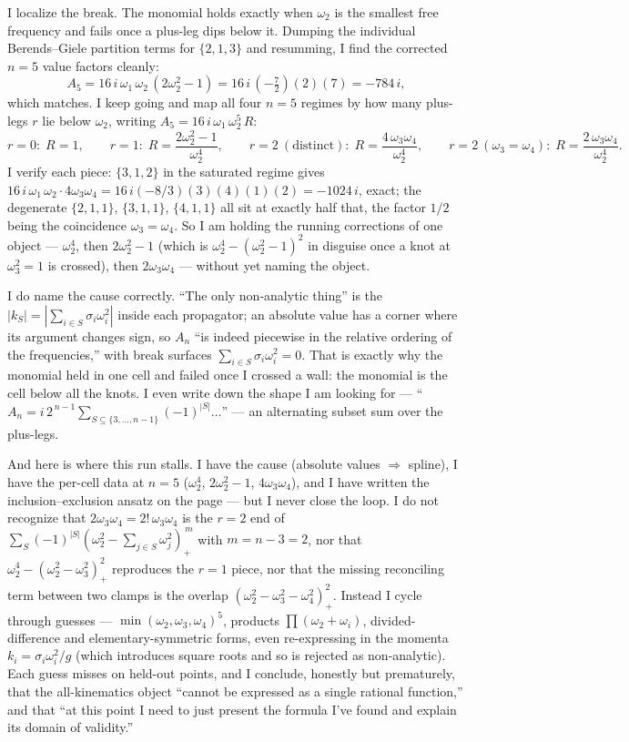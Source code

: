 \documentclass{article}
\begin{document}
I localize the break. The monomial holds exactly when $\omega_2$ is the smallest
free frequency and fails once a plus-leg dips below it. Dumping the individual
Berends--Giele partition terms for $\{2,1,3\}$ and resumming, I find the corrected
$n=5$ value factors cleanly:
\[
A_5 = 16\,i\,\omega_1\,\omega_2\,(2\omega_2^2-1)=16\,i\,(-\tfrac72)(2)(7)=-784\,i,
\]
which matches. I keep going and map all four $n=5$ regimes by how many plus-legs
$r$ lie below $\omega_2$, writing $A_5=16\,i\,\omega_1\,\omega_2^5\,R$:
\[
r=0:\;R=1,\qquad
r=1:\;R=\frac{2\omega_2^2-1}{\omega_2^4},\qquad
r=2\ (\text{distinct}):\;R=\frac{4\,\omega_3\omega_4}{\omega_2^4},\qquad
r=2\ (\omega_3=\omega_4):\;R=\frac{2\,\omega_3\omega_4}{\omega_2^4}.
\]
I verify each piece: $\{3,1,2\}$ in the saturated regime gives
$16\,i\,\omega_1\,\omega_2\cdot4\omega_3\omega_4=16\,i(-8/3)(3)(4)(1)(2)=-1024\,i$,
exact; the degenerate $\{2,1,1\}$, $\{3,1,1\}$, $\{4,1,1\}$ all sit at exactly
half that, the factor $1/2$ being the coincidence $\omega_3=\omega_4$. So I am
holding the running corrections of one object --- $\omega_2^4$, then
$2\omega_2^2-1$ (which is $\omega_2^4-(\omega_2^2-1)^2$ in disguise once a knot at
$\omega_3^2=1$ is crossed), then $2\omega_3\omega_4$ --- without yet naming the
object.

I do name the cause correctly. ``The only non-analytic thing'' is the
$|k_S|=|\sum_{i\in S}\sigma_i\omega_i^2|$ inside each propagator; an absolute value
has a corner where its argument changes sign, so $A_n$ ``is indeed piecewise in
the relative ordering of the frequencies,'' with break surfaces
$\sum_{i\in S}\sigma_i\omega_i^2=0$. That is exactly why the monomial held in one
cell and failed once I crossed a wall: the monomial is the cell below all the
knots. I even write down the shape I am looking for ---
``$A_n=i\,2^{\,n-1}\sum_{S\subseteq\{3,\dots,n-1\}}(-1)^{|S|}\dots$'' --- an
alternating subset sum over the plus-legs.

And here is where this run stalls. I have the cause (absolute values $\Rightarrow$
spline), I have the per-cell data at $n=5$ ($\omega_2^4$, $2\omega_2^2-1$,
$4\omega_3\omega_4$), and I have written the inclusion--exclusion ansatz on the
page --- but I never close the loop. I do not recognize that
$2\omega_3\omega_4=2!\,\omega_3\omega_4$ is the $r=2$ end of
$\sum_{S}(-1)^{|S|}(\omega_2^2-\sum_{j\in S}\omega_j^2)_+^{\,m}$ with $m=n-3=2$,
nor that $\omega_2^4-(\omega_2^2-\omega_3^2)_+^2$ reproduces the $r=1$ piece, nor
that the missing reconciling term between two clamps is the overlap
$(\omega_2^2-\omega_3^2-\omega_4^2)_+^2$. Instead I cycle through guesses ---
$\min(\omega_2,\omega_3,\omega_4)^5$, products $\prod(\omega_2+\omega_i)$,
divided-difference and elementary-symmetric forms, even re-expressing in the
momenta $k_i=\sigma_i\omega_i^2/g$ (which introduces square roots and so is
rejected as non-analytic). Each guess misses on held-out points, and I conclude,
honestly but prematurely, that the all-kinematics object ``cannot be expressed as
a single rational function,'' and that ``at this point I need to just present the
formula I've found and explain its domain of validity.''
\end{document}

